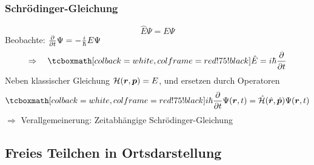 \subsubsection{Schrödinger-Gleichung}

\begin{equation*}
\hat{E} \Psi = E \Psi
\end{equation*}
Beobachte: $ \frac{\partial }{\partial t} \Psi = - \frac{i}{\hbar} E \Psi $
\begin{equation*}
\Rightarrow \quad \rmbox{\hat{E} = i \hbar \prt{}{t}}
\end{equation*}
Neben klassischer Gleichung $ \mathcal{H}(\bm{r},\bm{p}) = E $, und ersetzen durch Operatoren
\begin{equation*}
\rmbox{i \hbar \prt{}{t} \Psi(\vec{r},t) = \hat{\ham}(\hat{\vec{r}}, \hat{\vec{p}}) \Psi(\vec{r},t)}
\end{equation*}
$ \Rightarrow $ Verallgemeinerung: Zeitabhängige Schrödinger-Gleichung

\subsection{Freies Teilchen in Ortsdarstellung}

